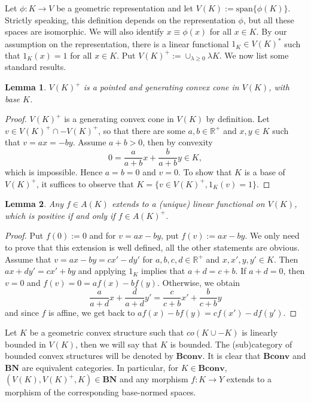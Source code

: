 \documentclass[12pt]{article}
\newtheorem{lemma}{Lemma}
\theoremstyle{remark}
\newcommand{\<}{\langle}
\newcommand{\ct}[1]{\mathbf{#1}}
\begin{document}
Let $\phi:K\to V$ be a geometric representation and let $V(K):=\mathrm{span}\{\phi(K)\}$. Strictly speaking, this definition depends on the representation $\phi$, but all
 these  spaces  are isomorphic. We will also identify $x\equiv \phi(x)$ for all $x\in K$. By our assumption on the representation, there is a linear functional $1_K\in V(K)^*$ such that 
 $1_K(x)=1$ for all $x\in K$. Put $V(K)^+:=\cup_{\lambda\ge 0} \lambda K$. We now list some standard results.

\begin{lemma} %
$V(K)^+$ is a pointed and generating convex cone in $V(K)$, with base $K$.

\end{lemma}

\begin{proof} $V(K)^+$ is a generating convex cone in $V(K)$ by definition. Let $v\in V(K)^+\cap -V(K)^+$, so that there are some $a,b\in \mathbb R^+$ and $x,y\in K$ such that $v=ax=-by$. Assume $a+b>0$, then by convexity 
\[
0=\frac a{a+b}x+\frac b{a+b}y\in K,
\]
 which is impossible. Hence $a=b=0$ and $v=0$. To show that $K$ is a base of $V(K)^+$, it suffices to observe that $K=\{v\in V(K)^+, 1_K(v)=1\}$.


\end{proof}



\begin{lemma}\label{lemma:extension} Any $f\in A(K)$ extends to a (unique) linear functional on $V(K)$, which is positive if and only if $f\in A(K)^+$.

\end{lemma}

\begin{proof} Put $f(0):=0$ and for $v=ax-by$, put $f(v):=ax-by$. We only need to prove that this extension is well defined, all the other  statements are obvious. Assume that $v=ax-by=cx'-dy'$ for $a,b,c,d\in \mathbb R^+$ and $x,x',y,y'\in K$. Then $ax+dy'=cx'+by$ and applying $1_K$ implies that $a+d=c+b$.
 If $a+d=0$, then $v=0$ and $f(v)=0=af(x)-bf(y)$. Otherwise, we obtain 
 \[
\frac a{a+d}x+ \frac d{a+d}y'=\frac c{c+b} x'+\frac b{c+b} y
 \]
and since $f$ is affine, we get back to $af(x)-bf(y)=cf(x')-df(y')$. 
\end{proof}






Let $K$ be a geometric convex structure such that $co(K\cup -K)$ is linearly bounded in $V(K)$, then we will say that $K$ is bounded.
 The (sub)category of  bounded convex structures will be denoted by $\ct{Bconv}$. It is clear that $\ct{Bconv}$ and $\ct{BN}$ are equivalent categories. In particular,
for $K\in \ct{Bconv}$, $(V(K),V(K)^+,K)\in \ct{BN}$ and any morphism $f:K\to Y$ extends to a morphism of the corresponding base-normed spaces. 
\end{document}

